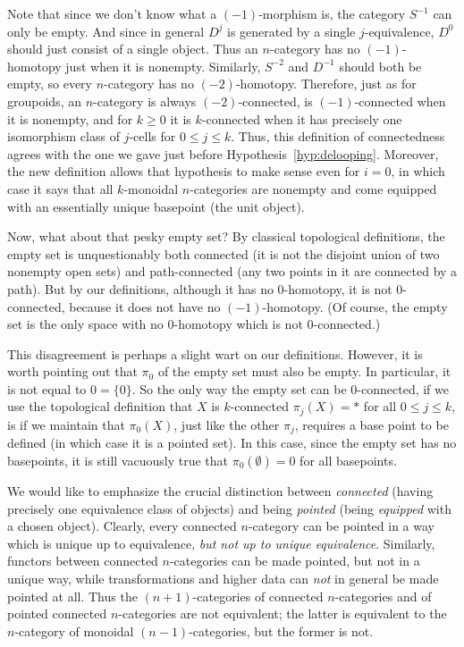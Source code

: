 \documentclass{amsart}
\begin{document}
Note that since we don't know what a $(-1)$-morphism is, the category
$S^{-1}$ can only be empty.  And since in general $D^j$ is generated
by a single $j$-equivalence, $D^0$ should just consist of a single
object.  Thus an $n$-category has no $(-1)$-homotopy just when it is
nonempty.  Similarly, $S^{-2}$ and $D^{-1}$ should both be empty, so
every $n$-category has no $(-2)$-homotopy.  Therefore, just as for
groupoids, an $n$-category is always $(-2)$-connected, is
$(-1)$-connected when it is nonempty, and for $k\ge 0$ it is
$k$-connected when it has precisely one isomorphism class of $j$-cells
for $0\le j\le k$.  Thus, this definition of connectedness agrees with
the one we gave just before Hypothesis~\ref{hyp:delooping}.  Moreover,
the new definition allows that hypothesis to make sense even for
$i=0$, in which case it says that all $k$-monoidal $n$-categories are
nonempty and come equipped with an essentially unique basepoint (the
unit object).

Now, what about that pesky empty set?  By classical topological
definitions, the empty set is unquestionably both connected (it is not
the disjoint union of two nonempty open sets) and path-connected (any
two points in it are connected by a path).  But by our definitions,
although it has no $0$-homotopy, it is not $0$-connected, because it
does not have no $(-1)$-homotopy.  (Of course, the empty set is the
only space with no $0$-homotopy which is not $0$-connected.)

This disagreement is perhaps a slight wart on our definitions.
However, it is worth pointing out that $\pi_0$ of the empty set must
also be empty.  In particular, it is not equal to $0=\{0\}$.  So the
only way the empty set can be $0$-connected, if we use the topological
definition that $X$ is $k$-connected $\pi_j(X)=*$ for all $0\le j\le
k$, is if we maintain that $\pi_0(X)$, just like the other $\pi_j$,
requires a base point to be defined (in which case it is a pointed
set).  In this case, since the empty set has no basepoints, it is
still vacuously true that $\pi_0(\emptyset)=0$ for all basepoints.

We would like to emphasize the crucial distinction between
\emph{connected} (having precisely one equivalence class of objects)
and being \emph{pointed} (being \emph{equipped} with a chosen object).
Clearly, every connected $n$-category can be pointed in a way which is
unique up to equivalence, \emph{but not up to unique equivalence}.
Similarly, functors between connected $n$-categories can be made
pointed, but not in a unique way, while transformations and higher
data can \emph{not} in general be made pointed at all.  Thus the
$(n+1)$-categories of connected $n$-categories and of pointed
connected $n$-categories are not equivalent; the latter is equivalent
to the $n$-category of monoidal $(n-1)$-categories, but the former is
not.
\end{document}
